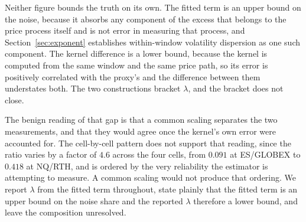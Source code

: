 Neither figure bounds the truth on its own. The fitted term is an upper bound on
the noise, because it absorbs any component of the excess that belongs to the
price process itself and is not error in measuring that process, and
Section~\ref{sec:exponent} establishes within-window volatility dispersion as one
such component. The kernel difference is a lower bound, because the kernel is
computed from the same window and the same price path, so its error is positively
correlated with the proxy's and the difference between them understates both. The
two constructions bracket $\lambda$, and the bracket does not close.

The benign reading of that gap is that a common scaling separates the two
measurements, and that they would agree once the kernel's own error were
accounted for. The cell-by-cell pattern does not support that reading, since the
ratio varies by a factor of $4.6$ across the four cells, from $0.091$ at
ES/GLOBEX to $0.418$ at NQ/RTH, and is ordered by the very reliability the %
estimator is attempting to measure. A common scaling would not produce that
ordering. We
report $\lambda$ from the fitted term throughout, state plainly that the fitted
term is an upper bound on the noise share and the reported $\lambda$ therefore a
lower bound, and leave the composition unresolved.
